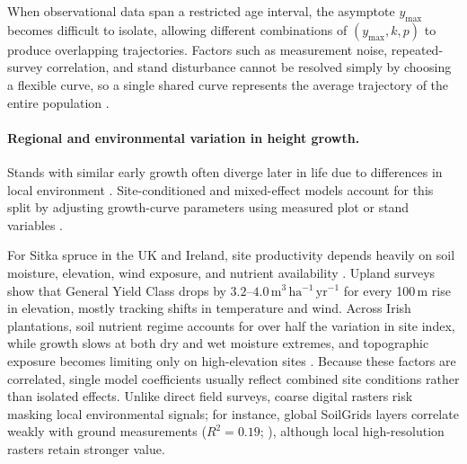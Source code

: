 When observational data span a restricted age interval, the asymptote $y_{\max}$ becomes difficult to isolate, allowing different combinations of $(y_{\max}, k, p)$ to produce overlapping trajectories. Factors such as measurement noise, repeated-survey correlation, and stand disturbance cannot be resolved simply by choosing a flexible curve, so a single shared curve represents the average trajectory of the entire population \cite{rennolls1995Forest_C2_CR}. 


\paragraph*{Regional and environmental variation in height growth.}
Stands with similar early growth often diverge later in life due to differences in local environment \cite{socha2021Regional_C2_CR}. Site-conditioned and mixed-effect models account for this split by adjusting growth-curve parameters using measured plot or stand variables \cite{scolforo2013Dominant_C2_CR,socha2016Assessment_C2_CR}.

For Sitka spruce in the UK and Ireland, site productivity depends heavily on soil moisture, elevation, wind exposure, and nutrient availability \cite{worrell1990Productivity1_C1_SS,farrelly2011Sitka_C1_SS}. Upland surveys show that General Yield Class drops by $3.2$--$4.0\,\mathrm{m^3\,ha^{-1}\,yr^{-1}}$ for every 100\,m rise in elevation, mostly tracking shifts in temperature and wind. Across Irish plantations, soil nutrient regime accounts for over half the variation in site index, while growth slows at both dry and wet moisture extremes, and topographic exposure becomes limiting only on high-elevation sites \cite{farrelly2011Sitka_C1_SS}. Because these factors are correlated, single model coefficients usually reflect combined site conditions rather than isolated effects. Unlike direct field surveys, coarse digital rasters risk masking local environmental signals; for instance, global SoilGrids layers correlate weakly with ground measurements ($R^2 = 0.19$; \citealt{miller2024Assessing_C2_CR}), although local high-resolution rasters retain stronger value.

